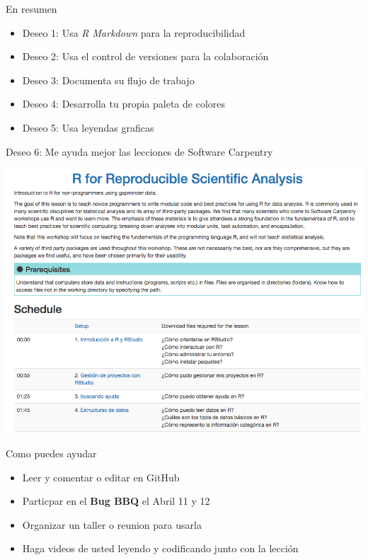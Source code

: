 \documentclass[ignorenonframetext,]{beamer}
\providecommand{\tightlist}{%
  \setlength{\itemsep}{0pt}\setlength{\parskip}{0pt}}
\begin{document}
\begin{frame}{En resumen}

\begin{itemize}
\tightlist
\item
  Deseo 1: Usa \emph{R Markdown} para la reproducibilidad
\item
  Deseo 2: Usa el control de versiones para la colaboración
\item
  Deseo 3: Documenta su flujo de trabajo
\item
  Deseo 4: Desarrolla tu propia paleta de colores
\item
  Deseo 5: Usa leyendas graficas
\end{itemize}

\end{frame}

\begin{frame}{Deseo 6: Me ayuda mejor las lecciones de Software
Carpentry}

\includegraphics{../figures/talk/R-gapminder-es.png}

\end{frame}

\begin{frame}{Como puedes ayudar}

\begin{itemize}[<+->]
\tightlist
\item
  Leer y comentar o editar en GitHub
\item
  Particpar en el \textbf{Bug BBQ} el Abril 11 y 12
\item
  Organizar un taller o reunion para usarla
\item
  Haga videos de usted leyendo y codificando junto con la lección
\end{itemize}

\end{frame}
\end{document}

